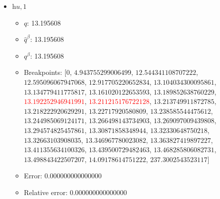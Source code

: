 \documentclass{article}%
\begin{document}
\begin{itemize}
	\begin{itemize}%
		\item $q$: 37.633255%
		\item $\hat{q}^\beta$: 37.633255%
		\item $q^\beta$: 37.633255%
		\item Breakpoints: $[$$0$, $18.023935870161154$, $21.04660840930274$, $24.97364426355679$, $30.189424467922265$, $34.23465128608717$, $36.670233878040335$, $37.21616748032837$, $37.443498367229196$, $37.47875108132638$, $37.52720514437563$, $37.554741031910254$, \textcolor{red}{$37.612770977560544$}, \textcolor{red}{$37.65435035996605$}, $37.6551299822246$, $37.682669717644174$, $37.71812813120871$, $37.76995088018704$, $37.78573239590169$, $37.821651654621526$, $37.88148462263016$, $37.9018730666985$, $37.9454585315849$, $37.95085342166671$, $38.035748486883605$, $38.10872593446926$, $38.21652191748154$, $38.224970554765775$, $38.88483572219945$, $285.4001551947793$$]$%
		\item Error: 0.000000000000000%
		\item Relative error: 0.000000000000000%
	\end{itemize}%
	\item $\textit{hu},1$%
	\begin{itemize}%
		\item $q$: 13.195608%
		\item $\hat{q}^\beta$: 13.195608%
		\item $q^\beta$: 13.195608%
		\item Breakpoints: $[$$0$, $4.943755299006499$, $12.544341108707222$, $12.595096067947068$, $12.917705220652834$, $13.104034300095861$, $13.134779411775817$, $13.161020122653593$, $13.189852638760229$, \textcolor{red}{$13.192252946941991$}, \textcolor{red}{$13.211215176722128$}, $13.213749911872785$, $13.218222920629291$, $13.22717920580809$, $13.238585544475612$, $13.244985069124171$, $13.266498143734903$, $13.269097009439808$, $13.294574825457861$, $13.30871858348944$, $13.32330648750218$, $13.32663103908035$, $13.346967780023082$, $13.363827419897227$, $13.411355634100326$, $13.439500729482463$, $13.468285806082731$, $13.498843422507207$, $14.09178614751222$, $237.3002543523117$$]$%
		\item Error: 0.000000000000000%
		\item Relative error: 0.000000000000000%
	\end{itemize}%
\end{itemize}%
\end{document}
